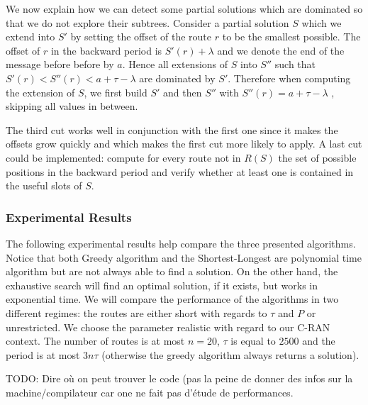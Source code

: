 \documentclass[a4paper,10pt]{article}
\newcommand{\todo}[1]{{\color{red} TODO: {#1}}}
\begin{document}
\begin{enumerate}
       We now explain how we can detect some partial solutions which are dominated so that we do not explore their subtrees.
       Consider a partial solution $S$ which we extend into $S'$ by setting the offset of the route $r$ to be the smallest possible. The offset of $r$ in the backward period is $S'(r)+ \lambda$ and we denote the end of the message before before by $a$. Hence all extensions of $S$ into $S''$ such that $S'(r)  < S''(r) < a + \tau - \lambda$ are dominated by $S'$. Therefore when computing the extension of $S$, we first build $S'$ and then $S''$ with $S''(r) =  a + \tau - \lambda$ , skipping all values in between.
       
       \end{enumerate}
      
      The third cut works well in conjunction with the first one since it makes the offsets grow quickly and 
      which makes the first cut more likely to apply. A last cut could be implemented: compute for every route not in $R(S)$ the set of possible positions in the backward period and verify whether at least one is contained in the useful slots of $S$.


    \subsubsection{Experimental Results}\label{sec:experimental_results}
      
      The following experimental results help compare the three presented algorithms.
      Notice that both Greedy algorithm and the Shortest-Longest are polynomial time algorithm but are not always able to find a solution. On the other hand, the exhaustive search will find an optimal solution, if it exists, but works in exponential time. We will compare the performance of the algorithms in two different regimes: the routes are either short with regards to $\tau$ and $P$ or unrestricted.
      We choose the parameter realistic with regard to our C-RAN context. The number of routes 
      is at most $n = 20$, $\tau$ is equal to $2500$ and the period is at most $3n\tau$ (otherwise the greedy algorithm always returns a solution). 
      
      \todo{Dire où on peut trouver le code (pas la peine de donner des infos sur la machine/compilateur car one ne fait pas d'étude de performances.}
%             
% 
\end{document}

